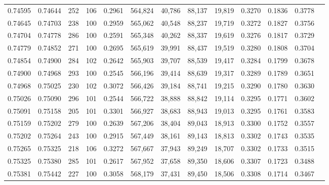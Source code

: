\begin{tabular}{rrrrrrrrrrrrr}
0.74595 & 0.74644 &   252 & 106 &                                     0.2961 & 564,824 &  40,786 &  88,137 &  19,819 & 0.3270 & 0.1836 & 0.3778 \\
0.74645 & 0.74703 &   238 & 100 &                                     0.2959 & 565,062 &  40,548 &  88,237 &  19,719 & 0.3272 & 0.1827 & 0.3756 \\
0.74704 & 0.74778 &   286 & 100 &                                     0.2591 & 565,348 &  40,262 &  88,337 &  19,619 & 0.3276 & 0.1817 & 0.3729 \\
0.74779 & 0.74852 &   271 & 100 &                                     0.2695 & 565,619 &  39,991 &  88,437 &  19,519 & 0.3280 & 0.1808 & 0.3704 \\
0.74854 & 0.74900 &   284 & 102 &                                     0.2642 & 565,903 &  39,707 &  88,539 &  19,417 & 0.3284 & 0.1799 & 0.3678 \\
0.74900 & 0.74968 &   293 & 100 &                                     0.2545 & 566,196 &  39,414 &  88,639 &  19,317 & 0.3289 & 0.1789 & 0.3651 \\
0.74968 & 0.75025 &   230 & 102 &                                     0.3072 & 566,426 &  39,184 &  88,741 &  19,215 & 0.3290 & 0.1780 & 0.3630 \\
0.75026 & 0.75090 &   296 & 101 &                                     0.2544 & 566,722 &  38,888 &  88,842 &  19,114 & 0.3295 & 0.1771 & 0.3602 \\
0.75091 & 0.75158 &   205 & 101 &                                     0.3301 & 566,927 &  38,683 &  88,943 &  19,013 & 0.3295 & 0.1761 & 0.3583 \\
0.75159 & 0.75202 &   279 & 100 &                                     0.2639 & 567,206 &  38,404 &  89,043 &  18,913 & 0.3300 & 0.1752 & 0.3557 \\
0.75202 & 0.75264 &   243 & 100 &                                     0.2915 & 567,449 &  38,161 &  89,143 &  18,813 & 0.3302 & 0.1743 & 0.3535 \\
0.75265 & 0.75325 &   218 & 106 &                                     0.3272 & 567,667 &  37,943 &  89,249 &  18,707 & 0.3302 & 0.1733 & 0.3515 \\
0.75325 & 0.75380 &   285 & 101 &                                     0.2617 & 567,952 &  37,658 &  89,350 &  18,606 & 0.3307 & 0.1723 & 0.3488 \\
0.75381 & 0.75442 &   227 & 100 &                                     0.3058 & 568,179 &  37,431 &  89,450 &  18,506 & 0.3308 & 0.1714 & 0.3467 \\

\end{tabular}
